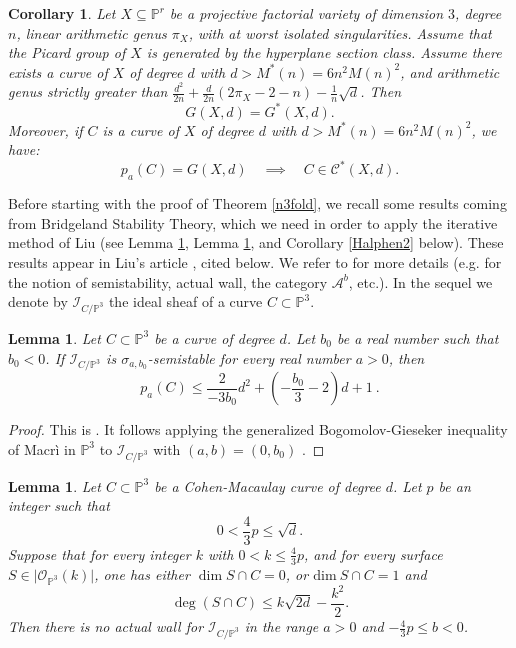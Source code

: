 \documentclass[9pt,a4paper]{amsart}
\theoremstyle{plain}
\newtheorem{lemma}[theorem]{Lemma}
\newtheorem{corollary}[theorem]{Corollary}
\theoremstyle{definition}
\theoremstyle{remark}
\begin{document}
\smallskip
\begin{corollary}\label{cor2}
Let $X\subseteq\mathbb P^r$ be a projective factorial  variety of
dimension $3$, degree $n$, linear arithmetic genus $\pi_X$, with at
worst isolated singularities. Assume that the Picard group of $X$ is
generated by the hyperplane section class. Assume there exists a
curve of $X$ of degree $d$ with $d>M^*(n)=6n^2M(n)^2$, and
arithmetic genus strictly greater  than
$\frac{d^2}{2n}+\frac{d}{2n}\left(2\pi_X-2-n\right)-\frac{1}{n}\sqrt{d}$.
Then
$$
G(X,d)=G^*(X,d).
$$
Moreover, if $C$ is a curve of $X$ of degree $d$ with
$d>M^*(n)=6n^2M(n)^2$, we have:
$$
p_a(C)=G(X,d)\quad \implies \quad C\in \mathcal C^*(X,d).
$$
\end{corollary}




Before starting with the proof of Theorem \ref{n3fold}, we recall
some results coming from Bridgeland Stability Theory, which we need
in order to apply the iterative method of Liu (see Lemma \ref{lemma:bogomolov}, Lemma \ref{lemma:actualwalls},
and Corollary \ref{Halphen2} below). These results appear in Liu's article \cite{Liu}, cited below.
We refer to  \cite{Liu}  for more details (e.g. for the notion of semistability, actual wall, the category
$\mathcal A^b$, etc.).
In the sequel we denote by $\mathcal I_{C/\mathbb{P}^3}$ the ideal sheaf of a curve $C\subset \mathbb{P}^3$.

\begin{lemma}\label{lemma:bogomolov}
Let $C\subset \mathbb{P}^3$ be a curve of degree $d$.
Let $b_0$ be a real number such that $b_0<0$.
If
$\mathcal I_{C/\mathbb{P}^3}$  is $\sigma_{a,b_0}$-semistable for every real number $a>0$, then
\begin{equation*}
p_a(C)\le \dfrac{2}{-3b_0}d^2 + \left( - \dfrac{b_0}{3} - 2 \right)d
+ 1\ .
\end{equation*}
\end{lemma}
\begin{proof}
This is \cite[p.~15, Lemma 4.2]{Liu}. It follows applying  the
generalized Bogomolov-Gieseker inequality of Macr\`i in
$\mathbb{P}^3$ to $\mathcal I_{C/\mathbb{P}^3}$ with $(a,b) = (0, b_0)$
\cite{Macri'}.
\end{proof}



\begin{lemma}\label{lemma:actualwalls}
Let $C\subset \mathbb{P}^3$ be a Cohen-Macaulay curve of degree $d$.
Let $p$ be an integer such that
$$
0<\frac{4}{3}p\leq \sqrt{d}.
$$
Suppose that for every integer $k$ with $0<k\leq \frac{4}{3}p$, and for every surface
$S \in \vert \mathcal{O}_{\mathbb{P}^3}(k) \vert$, one has
either $\dim S\cap C=0$, or $\mathrm{dim}\ S\cap C = 1$
and
\begin{equation}\label{equation:smalldegree}
\deg(S\cap C) \leq k\sqrt{2d}-\dfrac{k^2}{2}.
\end{equation}
Then there is no actual wall for $\mathcal I_{C/\mathbb{P}^3} $ in the range
$a> 0$ and $ - \frac{4}{3}p \le b < 0$.
\end{lemma}
\end{document}

